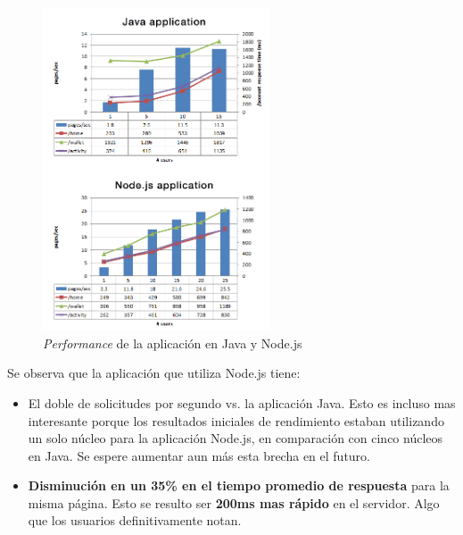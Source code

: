 \begin{figure}[h!]
	\centering
	\includegraphics[width=0.6\textwidth]{figuras/cap2/java_nodejs_benchmark_paypal.png}
	\caption{\textit{Performance} de la aplicación en Java y Node.js}
	\label{cap2:figure:java_benchmark_paypal}
\end{figure}

Se observa que la aplicación que utiliza Node.js tiene:



\begin{itemize}
\item El doble de solicitudes por segundo vs. la aplicación Java. Esto es incluso mas interesante porque los resultados iniciales de rendimiento estaban utilizando un solo núcleo para la aplicación Node.js, en comparación con cinco núcleos en Java. Se espere aumentar aun más esta brecha en el futuro.
\item \textbf{Disminución en un 35\% en el tiempo promedio de respuesta} para la misma página. Esto se resulto ser \textbf{200ms mas rápido} en el servidor. Algo que los usuarios definitivamente notan.
\end{itemize}


